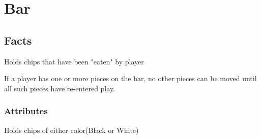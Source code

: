 \section{Bar}

\subsection{Facts}
\begin{dashed}
	\item Holds chips that have been "eaten" by player
	\item If a player has one or more pieces on the bar,
	 no other pieces can be moved until all such pieces
	 have re-entered play.
\end{dashed}

\subsubsection{Attributes}
\begin{dashed}
	\item Holds chips of either color(Black or White)
\end{dashed}

